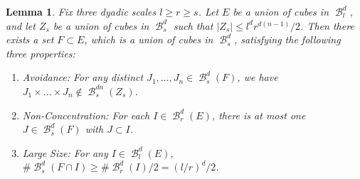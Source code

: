 \documentclass[dvipsnames,letterpaper,12pt]{article}
\numberwithin{equation}{section}
\theoremstyle{plain}
\newtheorem{lemma}{Lemma}
\DeclareMathOperator{\B}{\mathcal{B}}
\begin{document}
\begin{lemma} \label{discretelemma}
	Fix three dyadic scales $l \geq r \geq s$. Let $E$ be a union of cubes in $\B^d_l$, and let $Z_s$ be a union of cubes in $\B^d_s$ such that $|Z_s| \leq l^d r^{d(n-1)}/2$. Then there exists a set $F \subset E$, which is a union of cubes in $\B^d_s$, satisfying the following three properties:
	\begin{enumerate}
		\item\label{avoidanceItem} \emph{Avoidance}: For any distinct $J_1, \dots, J_n \in \B^d_s(F)$, we have $J_1 \times \dots \times J_n \not \in \B_s^{dn}(Z_s)$.
		\item\label{nonConcentrationItem} \emph{Non-Concentration}: For each $I \in \B_r^d(E)$, there is at most one $J \in \B_s^d(F)$ with $J \subset I$.
		\item\label{largeSizeItem} \emph{Large Size}: For any $I \in \B^d_l(E)$, $\# \B^d_s(F \cap I) \geq \# \B^d_r(I) / 2 = (l/r)^d / 2$.
	\end{enumerate}
\end{lemma}
\end{document}
